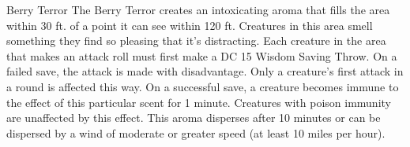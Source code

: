 \begin{DndMonster}[width=0.5\textwidth]{Berry Terror}
    The Berry Terror creates an intoxicating aroma that fills the area within 30 ft. of a point it can see within 120 ft. Creatures in this area smell something they find so pleasing that it's distracting. Each creature in the area that makes an attack roll must first make a DC 15 Wisdom Saving Throw. On a failed save, the attack is made with disadvantage. Only a creature's first attack in a round is affected this way. On a successful save, a creature becomes immune to the effect of this particular scent for 1 minute. Creatures with poison immunity are unaffected by this effect. This aroma disperses after 10 minutes or can be dispersed by a wind of moderate or greater speed  (at least 10 miles per hour).
\end{DndMonster}%
\vspace*{-2.4\fontdimen6\font}\hfill\\

